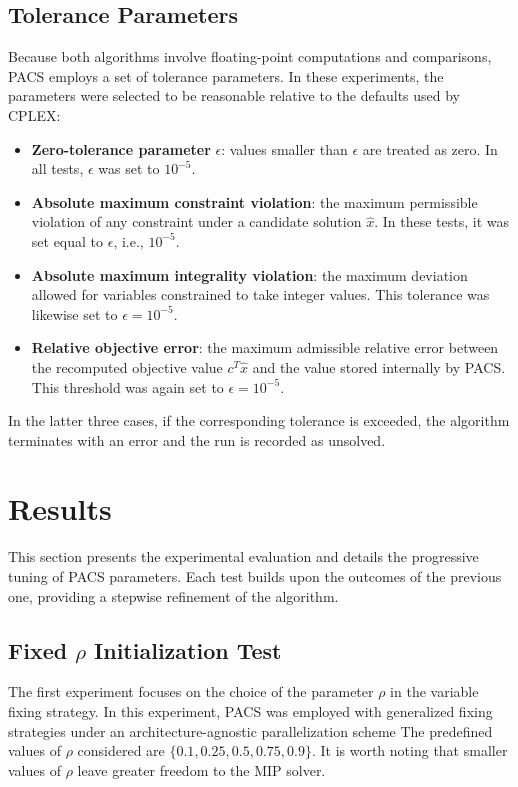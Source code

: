 \subsection{Tolerance Parameters}
Because both algorithms involve floating-point computations and comparisons, PACS employs a set of tolerance parameters. In these experiments, the parameters were selected to be reasonable relative to the defaults used by CPLEX:
\begin{itemize}
    \item \textbf{Zero-tolerance parameter} $\epsilon$: values smaller than $\epsilon$ are treated as zero. In all tests, $\epsilon$ was set to $10^{-5}$.
    \item \textbf{Absolute maximum constraint violation}: the maximum permissible violation of any constraint under a candidate solution $\hat{x}$. In these tests, it was set equal to $\epsilon$, i.e., $10^{-5}$.
    \item \textbf{Absolute maximum integrality violation}: the maximum deviation allowed for variables constrained to take integer values. This tolerance was likewise set to $\epsilon = 10^{-5}$.
    \item \textbf{Relative objective error}: the maximum admissible relative error between the recomputed objective value $c^T \hat{x}$ and the value stored internally by PACS. This threshold was again set to $\epsilon = 10^{-5}$.  
\end{itemize}  
In the latter three cases, if the corresponding tolerance is exceeded, the algorithm terminates with an error and the run is recorded as unsolved.  

\section{Results}\label{sec:result}
This section presents the experimental evaluation and details the progressive tuning of PACS parameters. Each test builds upon the outcomes of the previous one, providing a stepwise refinement of the algorithm.

\subsection{Fixed $\rho$ Initialization Test}\label{sec:test_fix_rho}
The first experiment focuses on the choice of the parameter $\rho$ in the variable fixing strategy.  
In this experiment, PACS was employed with generalized fixing strategies under an architecture-agnostic parallelization scheme
The predefined values of $\rho$ considered are $\{0.1, 0.25, 0.5, 0.75, 0.9\}$.  
It is worth noting that smaller values of $\rho$ leave greater freedom to the MIP solver.  

